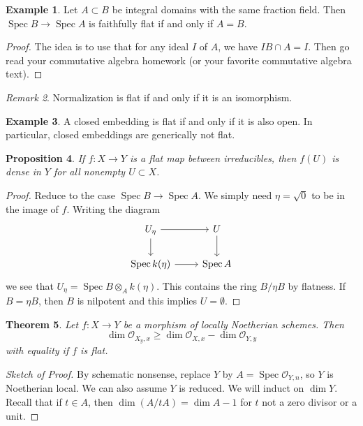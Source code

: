 \documentclass[leqno, openany]{memoir}
\newtheorem{thm}{Theorem}[section]
\newtheorem{prop}[thm]{Proposition}
\theoremstyle{definition}
\newtheorem{exm}[thm]{Example}
\theoremstyle{remark}
\newtheorem{rmk}[thm]{Remark}
\theoremstyle{plain}
\theoremstyle{definition}
\theoremstyle{remark}
\newcommand{\mc}[1]{\mathcal{#1}}
\DeclareMathOperator{\Spec}{Spec}
\begin{document}
\begin{exm}
    Let $A \subset B$ be integral domains with the same fraction field. Then $\Spec B \to \Spec A$ is faithfully flat if and only if $A = B$.
\end{exm}

\begin{proof}
    The idea is to use that for any ideal $I$ of $A$, we have $IB \cap A = I$. Then go read your commutative algebra homework (or your favorite commutative algebra text).
\end{proof}

\begin{rmk}
    Normalization is flat if and only if it is an isomorphism.
\end{rmk}

\begin{exm}
    A closed embedding is flat if and only if it is also open. In particular, closed embeddings are generically not flat.
\end{exm}

\begin{prop}
    If $f \colon X \to Y$ is a flat map between irreducibles, then $f(U)$ is dense in $Y$ for all nonempty $U \subset X$.
\end{prop}

\begin{proof}
    Reduce to the case $\Spec B \to \Spec A$. We simply need $\eta = \sqrt{0}$ to be in the image of $f$. Writing the diagram
    \begin{equation*}
    \begin{tikzcd}
        U_{\eta} \arrow{r} \arrow{d} & U \arrow{d} \\
        \Spec k(\eta) \arrow{r} & \Spec A
    \end{tikzcd}
    \end{equation*}
    we see that $U_{\eta} = \Spec B \otimes_A k(\eta)$. This contains the ring $B / \eta B$ by flatness. If $B = \eta B$, then $B$ is nilpotent and this implies $U = \emptyset$.
\end{proof}

\begin{thm}
    Let $f \colon X \to Y$ be a morphism of locally Noetherian schemes. Then
    \[ \dim \mc{O}_{X_y, x} \geq \dim \mc{O}_{X,x} - \dim \mc{O}_{Y,y} \]
    with equality if $f$ is flat.
\end{thm}

\begin{proof}[Sketch of Proof]
    By schematic nonsense, replace $Y$ by $A = \Spec \mc{O}_{Y,n}$, so $Y$ is Noetherian local. We can also assume $Y$ is reduced. We will induct on $\dim Y$. Recall that if $t \in A$, then $\dim (A/tA) = \dim A - 1$ for $t$ not a zero divisor or a unit.
\end{proof}
\end{document}
